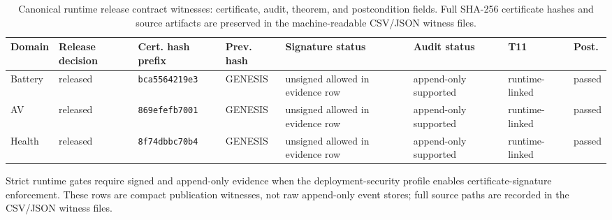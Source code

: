 \begin{table}[t]
\centering
\caption{Canonical runtime release contract witnesses: certificate, audit, theorem,
and postcondition fields.  Full SHA-256 certificate hashes and source artifacts are
preserved in the machine-readable CSV/JSON witness files.}
\label{tab:runtime-release-contract-governance}
\scriptsize
\renewcommand{\arraystretch}{1.12}
\setlength{\tabcolsep}{3pt}
\begin{tabular}{@{}p{} p{} p{} p{} p{} p{} p{} p{}@{}}
\toprule
\textbf{Domain} & \textbf{Release decision} & \textbf{Cert. hash prefix} &
\textbf{Prev. hash} & \textbf{Signature status} & \textbf{Audit status} &
\textbf{T11} & \textbf{Post.}\\
\midrule
Battery & released & \texttt{bca5564219e3} & GENESIS &
unsigned allowed in evidence row & append-only supported &
runtime-linked & passed\\
AV & released & \texttt{869efefb7001} & GENESIS &
unsigned allowed in evidence row & append-only supported &
runtime-linked & passed\\
Health & released & \texttt{8f74dbbc70b4} & GENESIS &
unsigned allowed in evidence row & append-only supported &
runtime-linked & passed\\
\bottomrule
\end{tabular}
\par\smallskip
\scriptsize Strict runtime gates require signed and append-only evidence when the
deployment-security profile enables certificate-signature enforcement.  These rows
are compact publication witnesses, not raw append-only event stores; full source
paths are recorded in the CSV/JSON witness files.
\end{table}
